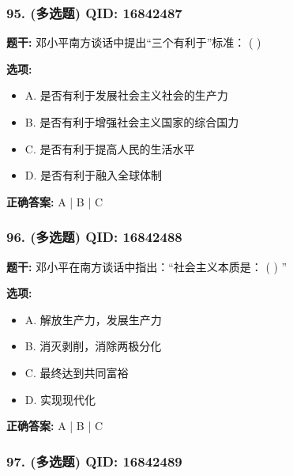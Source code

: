 \documentclass[12pt,UTF8]{ctexart}
\begin{document}
\subsubsection*{95. (多选题) \small QID: 16842487}

\textbf{题干:}
邓小平南方谈话中提出“三个有利于”标准： ( )

\textbf{选项:}
\begin{itemize}[leftmargin=*]

  \item A. 是否有利于发展社会主义社会的生产力

  \item B. 是否有利于增强社会主义国家的综合国力

  \item C. 是否有利于提高人民的生活水平

  \item D. 是否有利于融入全球体制

\end{itemize}

\textbf{正确答案:}
A | B | C

\vspace{0.3em}\hrulefill\vspace{0.7em}

\subsubsection*{96. (多选题) \small QID: 16842488}

\textbf{题干:}
邓小平在南方谈话中指出：“社会主义本质是： ( ) ”

\textbf{选项:}
\begin{itemize}[leftmargin=*]

  \item A. 解放生产力，发展生产力

  \item B. 消灭剥削，消除两极分化

  \item C. 最终达到共同富裕

  \item D. 实现现代化

\end{itemize}

\textbf{正确答案:}
A | B | C

\vspace{0.3em}\hrulefill\vspace{0.7em}

\subsubsection*{97. (多选题) \small QID: 16842489}
\end{document}
